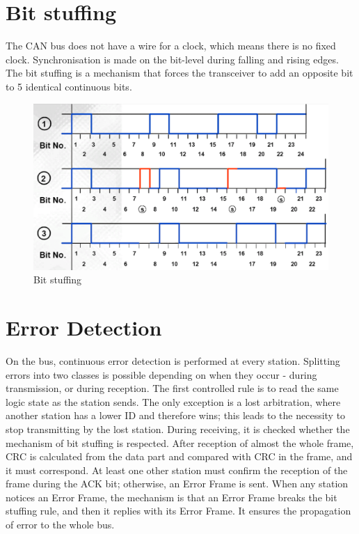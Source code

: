 \documentclass{ctuthesis}
\begin{document}
 \section{Bit stuffing}
 The CAN bus does not have a wire for a clock, which means there is no fixed clock. Synchronisation is made on the bit-level during falling and rising edges. The bit stuffing is a mechanism that forces the transceiver to add an opposite bit to 5 identical continuous bits.
  
\begin{figure}[htb]
 \includegraphics[width=1\textwidth]{images/bitstuffing.pdf}
 \caption{Bit stuffing \cite{can-course}}
\end{figure}
 
 \section{Error Detection}
 On the bus, continuous error detection is performed at every station. Splitting errors into two classes is possible depending on when they occur - during transmission, or during reception. The first controlled rule is to read the same logic state as the station sends. The only exception is a lost arbitration, where another station has a lower ID and therefore wins; this leads to the necessity to stop transmitting by the lost station. During receiving, it is checked whether the mechanism of bit stuffing is respected. After reception of almost the whole frame, CRC is calculated from the data part and compared with CRC in the frame, and it must correspond. At least one other station must confirm the reception of the frame during the ACK bit; otherwise, an Error Frame is sent. When any station notices an Error Frame, the mechanism is that an Error Frame breaks the bit stuffing rule, and then it replies with its Error Frame. It ensures the propagation of error to the whole bus.
 
\end{document}
